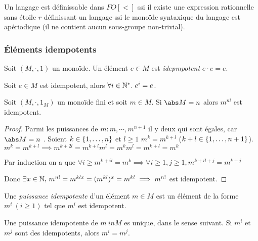 \begin{theorem}
	Un langage est définissable dans $FO[<]$ ssi il existe une expression rationnelle sans étoile $r$ définissant un langage
	ssi
	le monoïde syntaxique du langage est apériodique (\cad il ne contient aucun sous-groupe non-trivial).
\end{theorem}

\subsubsection{Éléments idempotents}

\begin{definition}
	Soit $(M,\cdot , 1)$ un monoïde. Un élément $e \in M$ est \emph{idepmpotent} \ssi $e \cdot e = e$.
\end{definition}

\begin{exercice} \label{ex:puiss_idemp}
	Soit $e \in M$ est idempotent, alors $\forall i \in \N^*. \ e^i = e$.
\end{exercice}

\begin{lemma}
	Soit $(M,\cdot , 1_M)$ un monoïde fini et soit $m \in M$. Si $\abs M = n$ alors $m^{n!}$ est idempotent.
\end{lemma}

\begin{proof}
	Parmi les puissances de $m : m, \cdots , m^{n+1}$ il y  deux qui sont égales, car $\abs M = n$ .
	Soient $k \in \left\{1,\ldots,n\right\}$ et $l \geq 1$ \tq $m ^{k} = m ^{k+l}$ ($k + l \in \left\{1,\ldots,n+1\right\}$).
	$m ^{k} = m ^{k+l} \implies m ^{k+2l} = m ^{k+l} m^l = m^k m^l = m^{k+l} = m^k$

	Par induction on a que $\forall i \geq m^{k+il} = m^{k} \implies \forall i \geq 1, j \geq 1, m^{k+il+ j} = m^{k +j}$

	Donc $\exists x \in \mathbb{N}, \, m^{n!} = m^{klx} = (m^{kl})^x = m^{kl} \implies m^{n!}$ est idempotent.
\end{proof}


\begin{definition}
	Une \emph{puissance idempotente} d'un élément $m \in M$ est un élément de la forme $m^i \ (i\geq 1)$ tel que $m^i$ est idempotent.
\end{definition}

\begin{lemma}\label{lem:puiss_idemp}
	Une puissance idempotente de $m\ in M$ es unique, dans le sense suivant. Si $m^i$ et $m^j$ sont des idempotents, alors $m^i = m^j$.
\end{lemma}

